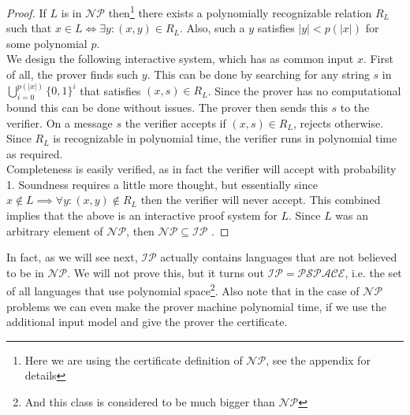 \documentclass{article}
\begin{document}
\begin{proof}
If $L$ is in $\mathcal{NP}$ then\footnote{Here we are using the certificate definition of $\mathcal{NP}$, see the appendix for details} there exists a polynomially recognizable relation $R_L$ such that $x \in L \iff \exists y : (x, y) \in R_L$. Also, such a $y$ satisfies $|y| < p(|x|)$ for some polynomial $p$. \\
We design the following interactive system, which has as common input $x$. 
First of all, the prover finds such $y$. This can be done by searching for any string $s$ in $ \bigcup_{i = 0}^{p(|x|)} \{0, 1\}^i$ that satisfies $(x, s) \in R_L$. Since the prover has no computational bound this can be done without issues. The prover then sends this $s$ to the verifier. On a message $s$ the verifier accepts if $(x, s) \in R_L$, rejects otherwise. Since $R_L$ is recognizable in polynomial time, the verifier runs in polynomial time as required.  \\ 
Completeness is easily verified, as in fact the verifier will accept with probability 1. Soundness requires a little more thought, but essentially since $x \notin L \implies \forall y : (x, y) \notin R_L $ then the verifier will never accept. This combined implies that the above is an interactive proof system for $L$. Since $L$ was an arbitrary element of $\mathcal{NP}$, then $\mathcal{NP} \subseteq \mathcal{IP}$ .
\end{proof}
In fact, as we will see next, $\mathcal{IP}$ actually contains languages that are not believed to be in $\mathcal{NP}$. We will not prove this, but it turns out $\mathcal{IP} = \mathcal{PSPACE}$, i.e. the set of all languages that use polynomial space\footnote{And this class is considered to be much bigger than $\mathcal{NP}$}. Also note that in the case of $\mathcal{NP}$ problems we can even make the prover machine polynomial time, if we use the additional input model and give the prover the certificate. 
\end{document}
